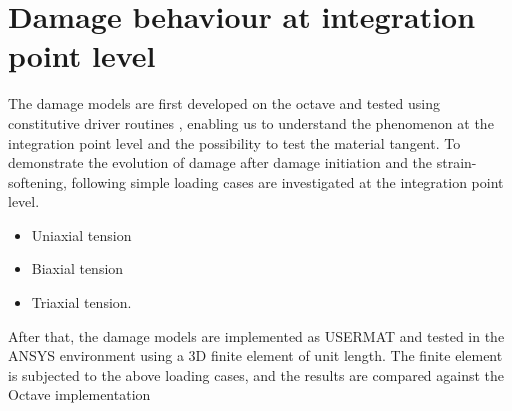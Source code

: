 \documentclass[12pt,a4paper,twoside,openright]{report}
\begin{document}
\section{Damage behaviour at integration point level}
\indent\indent\indent The damage models are first developed on the octave and tested using constitutive driver routines \citep{codes}, enabling us to understand the phenomenon at the integration point level and the possibility to test the material tangent. To demonstrate the evolution of damage after damage initiation and the strain-softening, following simple loading cases are investigated at the integration point level.
\begin{itemize}
\item Uniaxial tension
\item Biaxial tension
\item Triaxial tension.
\end{itemize} 
After that, the damage models are implemented as USERMAT and tested in the ANSYS environment using a 3D finite element of unit length. The finite element is subjected to the above loading cases, and the results are compared against the Octave implementation
\FloatBarrier
\end{document}
